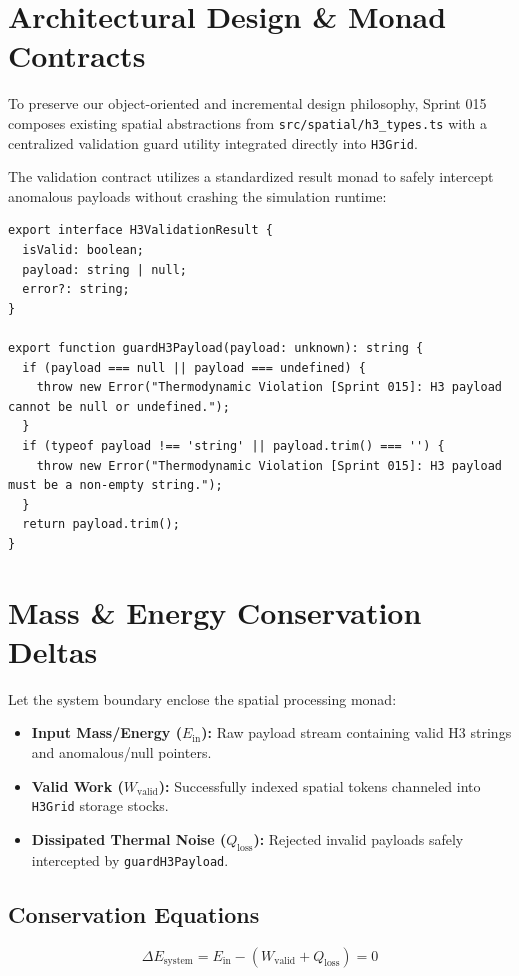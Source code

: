 \documentclass[11pt, a4paper]{article}
\begin{document}
\section{Architectural Design \& Monad Contracts}
To preserve our object-oriented and incremental design philosophy, Sprint 015 composes existing spatial abstractions from \texttt{src/spatial/h3\_types.ts} with a centralized validation guard utility integrated directly into \texttt{H3Grid}.

The validation contract utilizes a standardized result monad to safely intercept anomalous payloads without crashing the simulation runtime:

\begin{lstlisting}[caption={TypeScript Guard Implementation}]
export interface H3ValidationResult {
  isValid: boolean;
  payload: string | null;
  error?: string;
}

export function guardH3Payload(payload: unknown): string {
  if (payload === null || payload === undefined) {
    throw new Error("Thermodynamic Violation [Sprint 015]: H3 payload cannot be null or undefined.");
  }
  if (typeof payload !== 'string' || payload.trim() === '') {
    throw new Error("Thermodynamic Violation [Sprint 015]: H3 payload must be a non-empty string.");
  }
  return payload.trim();
}
\end{lstlisting}

\section{Mass \& Energy Conservation Deltas}
Let the system boundary enclose the spatial processing monad:
\begin{itemize}
    \item \textbf{Input Mass/Energy ($E_{\text{in}}$):} Raw payload stream containing valid H3 strings and anomalous/null pointers.
    \item \textbf{Valid Work ($W_{\text{valid}}$):} Successfully indexed spatial tokens channeled into \texttt{H3Grid} storage stocks.
    \item \textbf{Dissipated Thermal Noise ($Q_{\text{loss}}$):} Rejected invalid payloads safely intercepted by \texttt{guardH3Payload}.
\end{itemize}

\subsection{Conservation Equations}
\begin{equation}
\Delta E_{\text{system}} = E_{\text{in}} - (W_{\text{valid}} + Q_{\text{loss}}) = 0
\end{equation}
\end{document}

